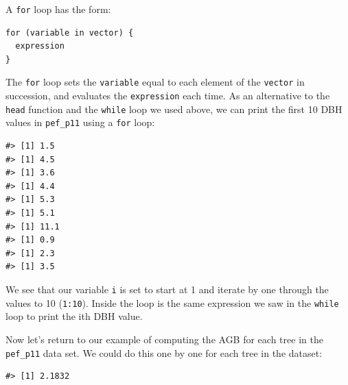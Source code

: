 \documentclass[
  11pt,
]{krantz}
\newenvironment{Shaded}{\begin{snugshade}}{\end{snugshade}}
\newcommand{\ControlFlowTok}[1]{\textcolor[rgb]{0.13,0.29,0.53}{\textbf{#1}}}
\newcommand{\DecValTok}[1]{\textcolor[rgb]{0.00,0.00,0.81}{#1}}
\newcommand{\KeywordTok}[1]{\textcolor[rgb]{0.13,0.29,0.53}{\textbf{#1}}}
\newcommand{\NormalTok}[1]{#1}
\newcommand{\OperatorTok}[1]{\textcolor[rgb]{0.81,0.36,0.00}{\textbf{#1}}}
\theoremstyle{definition}
\theoremstyle{definition}
\theoremstyle{definition}
\theoremstyle{definition}
\theoremstyle{remark}
\begin{document}
A \texttt{for} loop has the form:

\begin{verbatim}
for (variable in vector) {
  expression
}
\end{verbatim}

The \texttt{for} loop sets the \texttt{variable} equal to each element of the \texttt{vector} in succession, and evaluates the \texttt{expression} each time. As an alternative to the \texttt{head} function and the \texttt{while} loop we used above, we can print the first 10 DBH values in \texttt{pef\_p11} using a \texttt{for} loop:

\begin{Shaded}
\end{Shaded}

\begin{verbatim}
#> [1] 1.5
#> [1] 4.5
#> [1] 3.6
#> [1] 4.4
#> [1] 5.3
#> [1] 5.1
#> [1] 11.1
#> [1] 0.9
#> [1] 2.3
#> [1] 3.5
\end{verbatim}

We see that our variable \texttt{i} is set to start at 1 and iterate by one through the values to 10 (\texttt{1:10}). Inside the loop is the same expression we saw in the \texttt{while} loop to print the ith DBH value.

Now let's return to our example of computing the AGB for each tree in the \texttt{pef\_p11} data set. We could do this one by one for each tree in the dataset:

\begin{Shaded}
\end{Shaded}

\begin{verbatim}
#> [1] 2.1832
\end{verbatim}

\begin{Shaded}
\end{Shaded}
\end{document}

